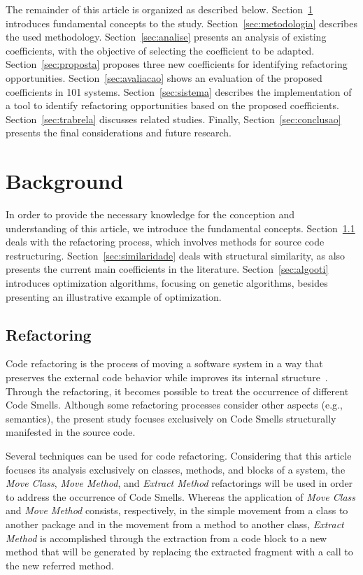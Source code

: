 \documentclass[smallextended,natbib]{svjour3}
\begin{document}
{The remainder of this article is organized as described below. Section~\ref{sec:background} introduces fundamental concepts to the study. Section~\ref{sec:metodologia} describes the used methodology. Section~\ref{sec:analise} presents an analysis of existing coefficients, with the objective of selecting the coefficient to be adapted. Section~\ref{sec:proposta} proposes three new coefficients for identifying refactoring opportunities. Section~\ref{sec:avaliacao} shows an evaluation of the proposed coefficients in 101 systems. Section~\ref{sec:sistema} describes the implementation of a tool to identify refactoring opportunities based on the proposed coefficients. Section~\ref{sec:trabrela} discusses related studies. Finally, Section~\ref{sec:conclusao} presents the final considerations and future research.

\section{Background}
\label{sec:background}
In order to provide the necessary knowledge for the conception and understanding of this article, we introduce the fundamental concepts. Section~\ref{sec:refatoracao} deals with the refactoring process, which involves methods for source code restructuring. Section~\ref{sec:similaridade} deals with structural similarity, as also presents the current main coefficients in the literature. Section~\ref{sec:algooti} introduces optimization algorithms, focusing on genetic algorithms, besides presenting an illustrative example of optimization. %

\subsection{Refactoring}
\label{sec:refatoracao}

Code refactoring is the process of moving a software system in a way that preserves the external code behavior while improves its internal structure~\citep{fowler1999refactoring}. Through the refactoring, it becomes possible to treat the occurrence of different Code Smells.
%
Although some refactoring processes consider other aspects (e.g., semantics), the present study focuses exclusively on Code Smells structurally manifested in the source code.

Several techniques can be used for code refactoring. Considering that this article focuses its analysis exclusively on classes, methods, and blocks of a system, the \textit{Move Class}, \textit{Move Method}, and \textit{Extract Method} refactorings will be used in order to address the occurrence of Code Smells. Whereas the application of  \textit{Move Class} and \textit{Move Method} consists, respectively, in the simple movement from a class to another package and in the movement from a method to another class,  \textit{Extract Method} is accomplished through the extraction from a code block to a new method that will be generated by replacing the extracted fragment with a call to the new referred method.

}
\end{document}
